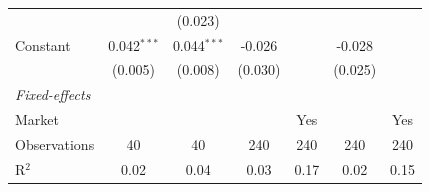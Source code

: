 \begin{tabular}{lcccccc}
                                            &               & (0.023)       &         &              &              &   \\   
   Constant                                 & 0.042$^{***}$ & 0.044$^{***}$ & -0.026  &              & -0.028       &   \\   
                                            & (0.005)       & (0.008)       & (0.030) &              & (0.025)      &   \\   
   \midrule
   \emph{Fixed-effects}\\
   Market                                   &               &               &         & Yes          &              & Yes\\  
   \midrule
   Observations                             & 40            & 40            & 240     & 240          & 240          & 240\\  
   R$^2$                                    & 0.02          & 0.04          & 0.03    & 0.17         & 0.02         & 0.15\\  
   \midrule \midrule
\end{tabular}
